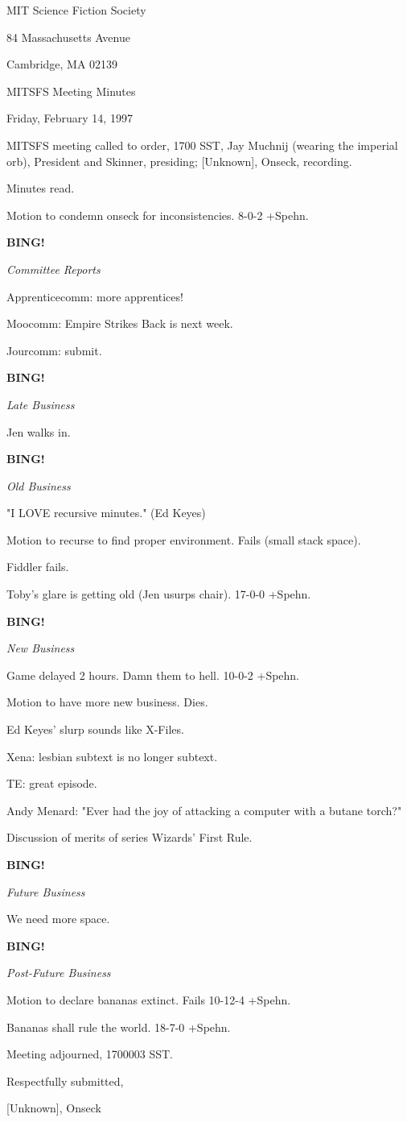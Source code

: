 \documentclass[12pt]{article}
\newcommand{\bing}{{\bf BING!} }
\newcommand{\goto}[1]{\bing \vskip 12pt \centerline{{\em{#1}}}}
\begin{document}
\begin{center}

MIT Science Fiction Society 

84 Massachusetts Avenue

Cambridge, MA 02139

\vspace{12pt}

MITSFS Meeting Minutes 

Friday, February 14, 1997

\end{center}
 
\vspace{18pt}

\setlength{\parskip}{6pt}

\noindent
MITSFS meeting called to order, 1700 SST,
Jay Muchnij (wearing the imperial orb), President and Skinner, presiding; [Unknown], Onseck, recording.

Minutes read.

Motion to condemn onseck for inconsistencies. 8-0-2 +Spehn.

\goto{Committee Reports}

Apprenticecomm: more apprentices!

Moocomm: Empire Strikes Back is next week.

Jourcomm: submit.

\goto{Late Business}

Jen walks in.

\goto{Old Business}

"I LOVE recursive minutes." (Ed Keyes)

Motion to recurse to find proper environment. Fails (small stack space).

Fiddler fails.

Toby's glare is getting old (Jen usurps chair). 17-0-0 +Spehn.

\goto{New Business}

Game delayed 2 hours. Damn them to hell. 10-0-2 +Spehn.

Motion to have more new business. Dies.

Ed Keyes' slurp sounds like X-Files.

Xena: lesbian subtext is no longer subtext.

TE: great episode.

Andy Menard: "Ever had the joy of attacking a computer with a butane torch?"

Discussion of merits of series Wizards' First Rule.

\goto{Future Business}

We need more space.

\goto{Post-Future Business}

Motion to declare bananas extinct. Fails 10-12-4 +Spehn.

Bananas shall rule the world. 18-7-0 +Spehn.

\vspace{12pt}

\noindent
Meeting adjourned, 1700003 SST.

\vspace{18pt}

\centerline{Respectfully submitted,}
\centerline{[Unknown], Onseck}
\end{document}
